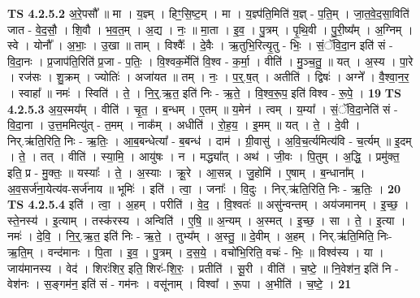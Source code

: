 \documentclass[17pt]{extarticle}
\begin{document}
                  \newline
                                \textbf{ TS 4.2.5.2} \newline
                  अ॒रे॒पसौ᳚ ॥ मा । य॒ज्ञ्म् । हिꣳ॒॒सि॒ष्ट॒म् । मा । य॒ज्ञ्प॑ति॒मिति॑ य॒ज्ञ् - प॒ति॒म् । जा॒त॒वे॒द॒सा॒विति॑ जात - वे॒द॒सौ॒ । शि॒वौ । भ॒व॒त॒म् । अ॒द्य । नः॒ ॥ मा॒ता । इ॒व॒ । पु॒त्रम् । पृ॒थि॒वी । पु॒री॒ष्य᳚म् । अ॒ग्निम् । स्वे । योनौ᳚ । अ॒भाः॒ । उ॒खा ॥ ताम् । विश्वैः᳚ । दे॒वैः । ऋ॒तुभि॒रित्यृ॒तु - भिः॒ । सं॒ॅवि॒दा॒न इति॑ सं - वि॒दा॒नः । प्र॒जाप॑ति॒रिति॑ प्र॒जा - प॒तिः॒ । वि॒श्वक॒र्मेति॑ वि॒श्व - क॒र्मा॒ । वीति॑ । मु॒ञ्च॒तु॒ ॥ यत् । अ॒स्य । पा॒रे । रज॑सः । शु॒क्रम् । ज्योतिः॑ । अजा॑यत ॥ तम् । नः॒ । प॒र्॒.ष॒त् । अतीति॑ । द्विषः॑ । अग्ने᳚ । वै॒श्वा॒न॒र॒ । स्वाहा᳚ ॥ नमः॑ । स्विति॑ । ते॒ । नि॒र्॒.ऋ॒त॒ इति॑ निः - ऋ॒ते॒ । वि॒श्व॒रू॒प॒ इति॑ विश्व - रू॒पे॒ । \textbf{  19} \newline
                  \newline
                                \textbf{ TS 4.2.5.3} \newline
                  अ॒य॒स्मय᳚म् । वीति॑ । चृ॒त॒ । ब॒न्धम् । ए॒तम् ॥ य॒मेन॑ । त्वम् । य॒म्या᳚ । सं॒ॅवि॒दा॒नेति॑ सं - वि॒दा॒ना । उ॒त्त॒ममित्यु॑त् - त॒मम् । नाक᳚म् । अधीति॑ । रो॒ह॒य॒ । इ॒मम् ॥ यत् । ते॒ । दे॒वी । निर्.ऋ॑ति॒रिति॒ निः - ऋ॒तिः॒ । आ॒ब॒बन्धेत्या᳚ - ब॒बन्ध॑ । दाम॑ । ग्री॒वासु॑ । अ॒वि॒च॒र्त्यमित्य॑वि - च॒र्त्यम् ॥ इ॒दम् । ते॒ । तत् । वीति॑ । स्या॒मि॒ । आयु॑षः । न । मद्ध्या᳚त् । अथ॑ । जी॒वः । पि॒तुम् । अ॒द्धि॒ । प्रमु॑क्त॒ इति॒ प्र - मु॒क्तः॒ ॥ यस्याः᳚ । ते॒ । अ॒स्याः । क्रू॒रे । आ॒सन्न् । जु॒होमि॑ । ए॒षाम् । ब॒न्धाना᳚म् । अ॒व॒सर्ज॑ना॒येत्य॑व-सर्ज॑नाय ॥ भूमिः॑ । इति॑ । त्वा॒ । जनाः᳚ । वि॒दुः । निर्.ऋ॑ति॒रिति॒ निः - ऋ॒तिः॒ । \textbf{  20} \newline
                  \newline
                                \textbf{ TS 4.2.5.4} \newline
                  इति॑ । त्वा॒ । अ॒हम् । परीति॑ । वे॒द॒ । वि॒श्वतः॑ ॥ असु॑न्वन्तम् । अय॑जमानम् । इ॒च्छ॒ । स्ते॒नस्य॑ । इ॒त्याम् । तस्क॑रस्य । अन्विति॑ । ए॒षि॒ ॥ अ॒न्यम् । अ॒स्मत् । इ॒च्छ॒ । सा । ते॒ । इ॒त्या । नमः॑ । दे॒वि॒ । नि॒र्॒.ऋ॒त॒ इति॑ निः - ऋ॒ते॒ । तुभ्य᳚म् । अ॒स्तु॒ ॥ दे॒वीम् । अ॒हम् । निर्.ऋ॑ति॒मिति॒ निः- ऋ॒ति॒म् । वन्द॑मानः । पि॒ता । इ॒व॒ । पु॒त्रम् । द॒स॒ये॒ । वचो॑भि॒रिति॒ वचः॑ - भिः॒ ॥ विश्व॑स्य । या । जाय॑मानस्य । वेद॑ । शिरः॑शिर॒ इति॒ शिरः॑-शि॒रः॒ । प्रतीति॑ । सू॒री । वीति॑ । च॒ष्टे॒ ॥ नि॒वेश॑न॒ इति॑ नि - वेश॑नः । स॒ङ्गम॑न॒ इति॑ सं - गम॑नः । वसू॑नाम् । विश्वा᳚ । रू॒पा । अ॒भीति॑ । च॒ष्टे॒ । \textbf{  21} \newline
\end{document}
